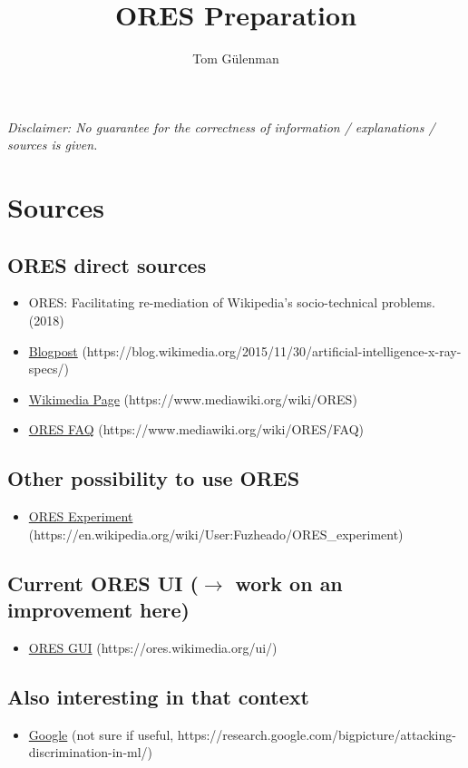 \documentclass[12pt,a4paper]{article}
\title{ORES Preparation}
\author{Tom Gülenman}
\begin{document}
\maketitle
\textit{Disclaimer: No guarantee for the correctness of information / explanations / sources is given.}
\section{Sources}
\subsection{ORES direct sources}
\begin{itemize}
\item ORES: Facilitating re-mediation of Wikipedia’s socio-technical problems. 
(2018)
\item \href{https://blog.wikimedia.org/2015/11/30/artificial-intelligence-x-ray-specs/}{Blogpost} (https://blog.wikimedia.org/2015/11/30/artificial-intelligence-x-ray-specs/)
\item \href{https://www.mediawiki.org/wiki/ORES}{Wikimedia Page} (https://www.mediawiki.org/wiki/ORES)
\item \href{https://www.mediawiki.org/wiki/ORES/FAQ}{ORES FAQ} (https://www.mediawiki.org/wiki/ORES/FAQ)
\end{itemize}
\subsection{Other possibility to use ORES}
\begin{itemize}
\item \href{https://en.wikipedia.org/wiki/User:Fuzheado/ORES_experiment}{ORES Experiment} (https://en.wikipedia.org/wiki/User:Fuzheado/ORES\_experiment)
\end{itemize}
\subsection{Current ORES UI (\(\rightarrow\) work on an improvement here)}
\begin{itemize}
\item \href{https://ores.wikimedia.org/ui/}{ORES GUI} (https://ores.wikimedia.org/ui/)
\end{itemize}
\subsection{Also interesting in that context}
\begin{itemize}
\item \href{https://research.google.com/bigpicture/attacking-discrimination-in-ml/}{Google} (not sure if useful, https://research.google.com/bigpicture/attacking-discrimination-in-ml/)
\end{itemize}
\end{document}
